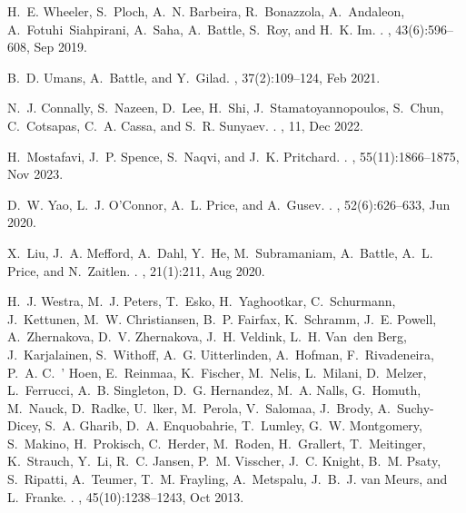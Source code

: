 \documentclass[
]{article}
\begin{document}
\begin{thebibliography}{100}
H.~E. Wheeler, S.~Ploch, A.~N. Barbeira, R.~Bonazzola, A.~Andaleon,
  A.~Fotuhi~Siahpirani, A.~Saha, A.~Battle, S.~Roy, and H.~K. Im.
.
, 43(6):596--608, Sep 2019.

B.~D. Umans, A.~Battle, and Y.~Gilad.
, 37(2):109--124, Feb 2021.

N.~J. Connally, S.~Nazeen, D.~Lee, H.~Shi, J.~Stamatoyannopoulos, S.~Chun,
  C.~Cotsapas, C.~A. Cassa, and S.~R. Sunyaev.
.
, 11, Dec 2022.

H.~Mostafavi, J.~P. Spence, S.~Naqvi, and J.~K. Pritchard.
.
, 55(11):1866--1875, Nov 2023.

D.~W. Yao, L.~J. O'Connor, A.~L. Price, and A.~Gusev.
.
, 52(6):626--633, Jun 2020.

X.~Liu, J.~A. Mefford, A.~Dahl, Y.~He, M.~Subramaniam, A.~Battle, A.~L. Price,
  and N.~Zaitlen.
.
, 21(1):211, Aug 2020.

H.~J. Westra, M.~J. Peters, T.~Esko, H.~Yaghootkar, C.~Schurmann, J.~Kettunen,
  M.~W. Christiansen, B.~P. Fairfax, K.~Schramm, J.~E. Powell, A.~Zhernakova,
  D.~V. Zhernakova, J.~H. Veldink, L.~H. Van~den Berg, J.~Karjalainen,
  S.~Withoff, A.~G. Uitterlinden, A.~Hofman, F.~Rivadeneira, P.~A. C.~' Hoen,
  E.~Reinmaa, K.~Fischer, M.~Nelis, L.~Milani, D.~Melzer, L.~Ferrucci, A.~B.
  Singleton, D.~G. Hernandez, M.~A. Nalls, G.~Homuth, M.~Nauck, D.~Radke,
  U.~lker, M.~Perola, V.~Salomaa, J.~Brody, A.~Suchy-Dicey, S.~A. Gharib, D.~A.
  Enquobahrie, T.~Lumley, G.~W. Montgomery, S.~Makino, H.~Prokisch, C.~Herder,
  M.~Roden, H.~Grallert, T.~Meitinger, K.~Strauch, Y.~Li, R.~C. Jansen, P.~M.
  Visscher, J.~C. Knight, B.~M. Psaty, S.~Ripatti, A.~Teumer, T.~M. Frayling,
  A.~Metspalu, J.~B.~J. van Meurs, and L.~Franke.
.
, 45(10):1238--1243, Oct 2013.


\end{thebibliography}
\end{document}
